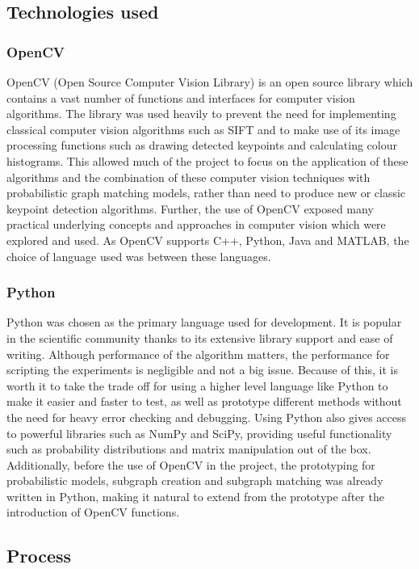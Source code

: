 \subsection{Technologies used}

\subsubsection{OpenCV}
OpenCV (Open Source Computer Vision Library) \cite{opencv} is an open source library which contains a vast number of functions and interfaces for computer vision algorithms. The library was used heavily to prevent the need for implementing classical computer vision algorithms such as SIFT \cite{sift} and to make use of its image processing functions such as drawing detected keypoints and calculating colour histograms. This allowed much of the project to focus on the application of these algorithms and the combination of these computer vision techniques with probabilistic graph matching models, rather than need to produce new or classic keypoint detection algorithms. Further, the use of OpenCV exposed many practical underlying concepts and approaches in computer vision which were explored and used.
\n
As OpenCV supports C++, Python, Java and MATLAB, the choice of language used was between these languages. 

\subsubsection{Python}
Python was chosen as the primary language used for development. It is popular in the scientific community thanks to its extensive library support and ease of writing. Although performance of the algorithm matters, the performance for scripting the experiments is negligible and not a big issue. Because of this, it is worth it to take the trade off for using a higher level language like Python to make it easier and faster to test, as well as prototype different methods without the need for heavy error checking and debugging. Using Python also gives access to powerful libraries such as NumPy and SciPy, providing useful functionality such as probability distributions and matrix manipulation out of the box. Additionally, before the use of OpenCV in the project, the prototyping for probabilistic models, subgraph creation and subgraph matching was already written in Python, making it natural to extend from the prototype after the introduction of OpenCV functions. 

\subsection{Process}

